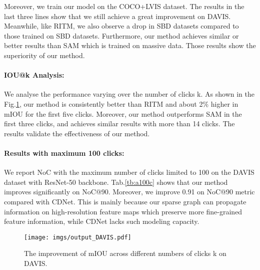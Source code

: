 \documentclass{bmvc2k}
\begin{document}
Moreover, we train our model on the COCO+LVIS dataset. The results in the last three lines show that we still achieve a great improvement on DAVIS. Meanwhile, like RITM, we also observe a drop in SBD datasets compared to those trained on SBD datasets. Furthermore, our method achieves similar or better results than SAM which is trained on massive data. Those results show the superiority of our method.



\vspace{-1mm}
\paragraph{\textbf{IOU@k Analysis:}} We analyse the performance varying over the number of clicks k. As shown in the Fig.\ref{fig:foobar}, our method is consistently better than RITM and about 2\% higher in mIOU for the first five clicks. Moreover, our method outperforms SAM in the first three clicks, and achieves similar results with more than 14 clicks. The results validate the effectiveness of our method.





\paragraph{\textbf{Results with maximum 100 clicks:}} 
We report NoC with the maximum number of clicks limited to 100 on the DAVIS dataset with ResNet-50 backbone. Tab.\ref{tb:a100c} shows that our method improves significantly on NoC@90. Moreover, we improve 0.91 on NoC@90 metric compared with CDNet. This is mainly because our sparse graph can propagate information on high-resolution feature maps which preserve more fine-grained feature information, while CDNet lacks such modeling capacity.


\begin{figure}[!t]
    \centering
    \texttt{[image: imgs/output\_DAVIS.pdf]}
\caption{\small{The improvement of mIOU across different numbers of clicks k on DAVIS.}}
    \label{fig:foobar}
\end{figure}
\end{document}
